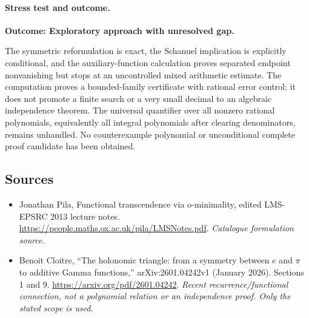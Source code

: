\documentclass[11pt,a4paper]{article}
\numberwithin{equation}{section}
\begin{document}
\paragraph{Stress test and outcome.}
\textbf{Outcome: Exploratory approach with unresolved gap.}

The symmetric reformulation is exact, the Schanuel implication is
explicitly conditional, and the auxiliary-function calculation proves separated endpoint
nonvanishing but stops at an uncontrolled mixed arithmetic estimate. The computation proves
a bounded-family certificate with rational error control; it does not
promote a finite search or a very small decimal to an algebraic
independence theorem. The universal quantifier over all nonzero rational
polynomials, equivalently all integral polynomials after clearing
denominators, remains unhandled. No counterexample polynomial or
unconditional complete proof candidate has been obtained.
\subsection{Sources}
\begin{itemize}\raggedright
\item[\textnormal{[S1]}]\hypertarget{source:statement:1}{} Jonathan Pila, Functional transcendence via o-minimality, edited LMS-EPSRC 2013 lecture notes.
\url{https://people.maths.ox.ac.uk/pila/LMSNotes.pdf}.
{\small\textit{Catalogue formulation source.}}
\item[\textnormal{[E1]}]\hypertarget{extra:statement:1}{} Benoit Cloitre, ``The holonomic triangle: from a symmetry between $e$ and $\pi$ to additive Gamma functions,'' arXiv:2601.04242v1 (January 2026). Sections 1 and 9.
\url{https://arxiv.org/pdf/2601.04242}.
{\small\textit{Recent recurrence/functional connection, not a polynomial relation or an independence proof. Only the stated scope is used.}}
\end{itemize}
\end{document}
